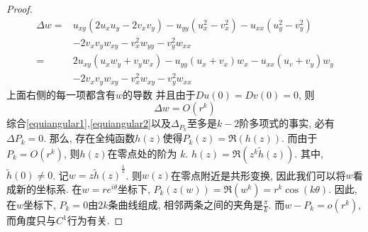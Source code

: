 \begin{proof}
    \begin{equation}
        \begin{split}
            \Delta w =& u_{xy}(2u_xu_y-2v_xv_y)-u_{yy}(u_x^2-v_x^2)-u_{xx}(u_y^2-v_y^2) \\
                &-2v_xv_yw_{xy}-v_x^2w_{yy}-v_y^2w_{xx} \\
                =&2u_{xy}(u_xw_y+v_yw_x)-u_{yy}(u_x+v_x)w_x-u_{xx}(u_v+v_y)w_y\\
                &-2v_xv_yw_{xy}-v_x^2w_{xy}-v_y^2w_{xx}
        \end{split}
    \end{equation}
    上面右侧的每一项都含有$w$的导数 并且由于$Du(0)=Dv(0)=0$, 则
    \begin{equation} \label{equiangular2}
        \Delta w= O(r^{k})
    \end{equation}
    综合\eqref{equiangular1},\eqref{equiangular2}以及$\Delta_{P_k}$至多是$k-2$阶多项式的事实, 必有 $\Delta P_k=0$.  那么, 存在全纯函数$h(z)$使得$P_k(z)=\Re(h(z))$. 而由于$P_k=O(r^k)$, 则$h(z)$在零点处的阶为 $k$. $h(z)=\Re(z^k\tilde{h}(z))$. 其中, $\tilde{h}(0) \ne 0$.  记$w=z{\tilde{h}(z)}^\frac{1}{k}$. 则$w(z)$在零点附近是共形变换, 因此我们可以将$w$看成新的坐标系.  在$w=re^{i\theta}$坐标下, $P_k(z(w))=\Re(w^k)=r^k\cos(k\theta)$. 因此, 在$w$坐标下, $P_k=0$由$2k$条曲线组成, 相邻两条之间的夹角是$\frac{\pi}{k}$. 而$w-P_k=o(r^k)$,  而角度只与$C^1$行为有关.
\end{proof}
